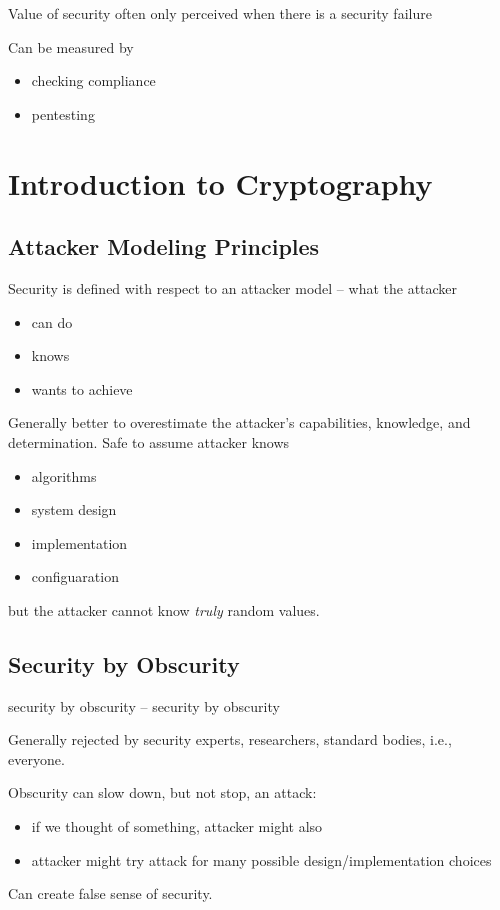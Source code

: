 \documentclass[draft]{article}
\begin{document}
Value of security often only perceived when there is a security failure

Can be measured by
\begin{itemize}[nosep]
    \item checking compliance
    \item pentesting
\end{itemize}

\section{Introduction to Cryptography}
\subsection{Attacker Modeling Principles}
Security is defined with respect to an \gls{attacker model} -- what the attacker
\begin{itemize}[nosep]
    \item can do
    \item knows
    \item wants to achieve
\end{itemize}

Generally better to overestimate the attacker's capabilities, knowledge, and determination. Safe to assume attacker knows
\begin{itemize}[nosep]
    \item algorithms
    \item system design
    \item implementation
    \item configuaration
\end{itemize}
but the attacker cannot know \emph{truly} random values.

\subsection{Security by Obscurity}
\Gls{security by obscurity} -- \glsdesc*{security by obscurity}

Generally rejected by security experts, researchers, standard bodies, i.e., everyone.

Obscurity can slow down, but not stop, an attack:
\begin{itemize}[nosep]
    \item if we thought of something, attacker might also
    \item attacker might try attack for many possible design/implementation choices
\end{itemize}
Can create false sense of security.
\end{document}
